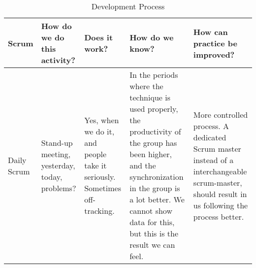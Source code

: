 \begin{sidewaystable}[]
\centering
\caption{Development Process}
\label{tab:dev-process-eval}
\begin{tabularx}{\textwidth}{|l|X|X|X|X|}
\hline
Scrum
& How do we do this activity?                                                                                                                                                                             & Does it work?                                                                                                                                                                                                                                                                              & How do we know?                                                                                                                                                                                                                                                                                                                                                                                                                                         & How can practice be improved?                                                                                                                                                                                                                                                                \\ \hline
Daily Scrum                 
& Stand-up meeting, yesterday, today, problems?                                                                                                                                                           
& Yes, when we do it, and people take it seriously. Sometimes off-tracking.                                                                                                                                                                                                                   
& In the periods where the technique is used properly, the productivity of the group has been higher, and the synchronization in the group is a lot better. We cannot show data for this, but this is the result we can feel.                                                                                                                                                                                                                             & More controlled process. A dedicated Scrum master instead of a interchangeable scrum-master, should result in us following the process better.                                                                                                                                                \\ \hline

\end{tabularx}
\end{sidewaystable}
